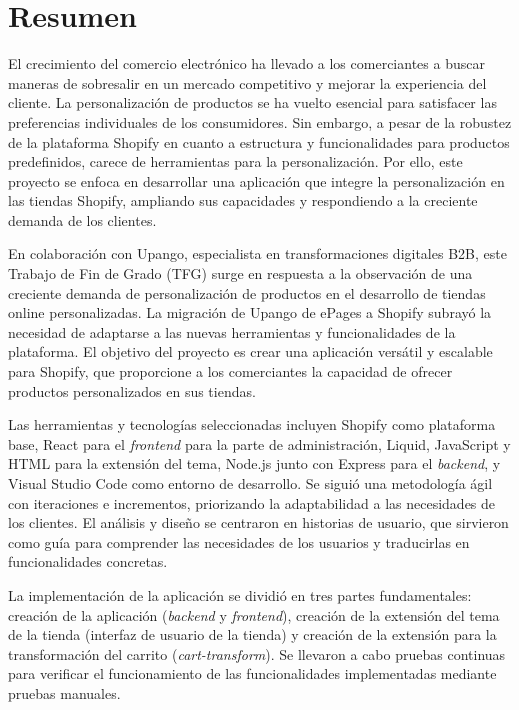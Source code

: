 \documentclass[11pt]{article}
\begin{document}
\section{Resumen}
El crecimiento del comercio electrónico ha llevado a los comerciantes a buscar maneras de sobresalir en un mercado competitivo y mejorar 
la experiencia del cliente. La personalización de productos se ha vuelto esencial para satisfacer las preferencias individuales de los consumidores. 
Sin embargo, a pesar de la robustez de la plataforma Shopify en cuanto a estructura y funcionalidades para productos predefinidos, carece de herramientas 
para la personalización. Por ello, este proyecto se enfoca en desarrollar una aplicación que integre la personalización en las tiendas Shopify, 
ampliando sus capacidades y respondiendo a la creciente demanda de los clientes.

En colaboración con Upango, especialista en transformaciones digitales B2B, este Trabajo de Fin de Grado (TFG) surge en respuesta a la observación 
de una creciente demanda de personalización de productos en el desarrollo de tiendas online personalizadas. La migración de Upango de ePages 
a Shopify subrayó la necesidad de adaptarse a las nuevas herramientas y funcionalidades de la plataforma. El objetivo del proyecto es crear 
una aplicación versátil y escalable para Shopify, que proporcione a los comerciantes la capacidad de ofrecer productos personalizados en sus tiendas.

Las herramientas y tecnologías seleccionadas incluyen Shopify como plataforma base, React para el \textit{frontend} para la parte de administración, Liquid, JavaScript y HTML 
para la extensión del tema, Node.js junto con Express para el \textit{backend}, 
y Visual Studio Code como entorno de desarrollo. Se siguió una metodología ágil con iteraciones e incrementos, priorizando la adaptabilidad a las 
necesidades de los clientes. El análisis y diseño se centraron en historias de usuario, que sirvieron como guía para comprender las necesidades de los usuarios y 
traducirlas en funcionalidades concretas.

La implementación de la aplicación se dividió en tres partes fundamentales: creación de la aplicación (\textit{backend} y \textit{frontend}), creación de la extensión del tema de la tienda (interfaz de usuario de la tienda) y
creación de la extensión para la transformación del carrito (\textit{cart-transform}). 
Se llevaron a cabo pruebas continuas para verificar el funcionamiento de las funcionalidades implementadas mediante pruebas manuales.
\end{document}

